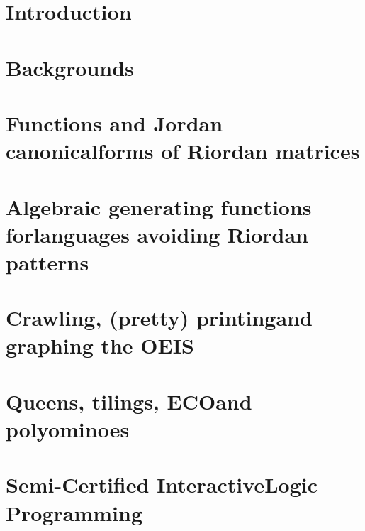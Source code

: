 \documentclass[a4paper,10pt]{tufte-book}
\begin{document}
\chapter*{Introduction}


\cleardoublepage

\chapter{Backgrounds}
\label{ch:backgrounds}



\chapter{Functions and Jordan canonical\newline forms of Riordan matrices}
\label{ch:Riordan-matrices-function}



\chapter{Algebraic generating functions for\newline languages avoiding Riordan patterns}
\label{ch:algebraic-gfs-languages-avoiding-Riordan-patterns}



\chapter{Crawling, (pretty) printing\newline and graphing the OEIS}
\label{ch:OEIS:tools}



\chapter{Queens, tilings, ECO\newline and polyominoes}
\label{ch:queens-tilings-polyominoes}



\chapter{Semi-Certified Interactive\newline Logic Programming}
\label{ch:scilp}



\iffalse
\chapter*{Conclusions}

\fi



\end{document}
